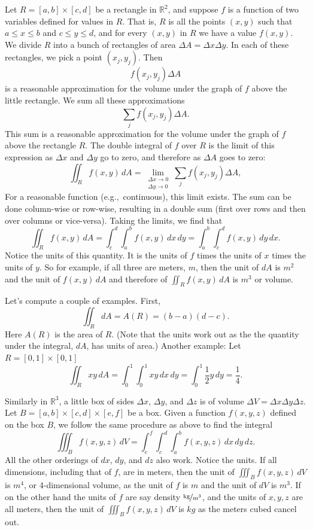 \documentclass[12pt]{article}
\newcommand{\R}{{\mathbb{R}}}
\begin{document}
Let $R = [a,b] \times [c,d]$ be a rectangle in $\R^2$, and suppose
$f$ is a function of two variables defined for values in $R$.
That is, $R$ is all the points
$(x,y)$ such that $a \leq x \leq b$ and $c \leq y \leq d$,
and for every $(x,y)$ in $R$ we have a value $f(x,y)$.
We divide $R$ into a bunch of rectangles of area $\Delta A = \Delta x \Delta y$.
In each of these rectangles, we pick a point $(x_j,y_j)$.  Then
\[
f(x_j,y_j) \Delta A
\]
is a reasonable approximation for the volume under the graph of $f$ above the little
rectangle.
We sum all these approximations
\[
\sum_j 
f(x_j,y_j) \Delta A .
\]
This sum is
a reasonable approximation for the volume under the graph of $f$ above the rectangle
$R$.
The double integral of $f$ over $R$ is the limit of
this expression
as $\Delta x$ and $\Delta y$ go to zero,
and therefore as $\Delta A$ goes to zero:
\[
\iint_R f(x,y) \, dA =
\lim_{\substack{\Delta x \to 0 \\ \Delta y \to 0}}
\sum_j 
f(x_j,y_j) \Delta A ,
\]
For a reasonable function (e.g.,\ continuous), this limit exists.
The sum can be done column-wise or row-wise, resulting in a
double sum (first over rows and then over columns or vice-versa).
Taking the limits, we find that
\[
\iint_R f(x,y) \, dA
=
\int_c^d \int_a^b f(x,y) \, dx \, dy
=
\int_a^b \int_c^d f(x,y) \, dy \, dx .
\]
Notice the units of this quantity.  It is the units of $f$ times the units of $x$ times
the units of $y$.  So for example, if all three are meters, $\unit{m}$,
then the unit of $dA$ is $\unit{m^2}$ and
the unit of
$f(x,y) \, dA$
and therefore of
$\iint_R f(x,y) \, dA$
is $\unit{m^3}$ or volume.

Let's compute a couple of examples.
First,
\[
\iint_R dA = A(R) = (b-a)(d-c) .
\]
Here $A(R)$ is the area of $R$.
(Note that the units work out as the 
the quantity under the integral, $dA$, has units of area.)
Another example:  Let $R = [0,1] \times [0,1]$
\[
\iint_R xy\, dA =
\int_0^1 \int_0^1 xy \, dx \, dy
=
\int_0^1 \frac{1}{2} y \, dy
= \frac{1}{4}.
\]

Similarly in $\R^3$, a little box of sides $\Delta x$, $\Delta y$, and $\Delta z$
is of volume $\Delta V = \Delta x \Delta y \Delta z$.  
Let $B = [a,b] \times [c,d] \times [e,f]$ be a box.
Given a function $f(x,y,z)$
defined on the box $B$, we follow
the same procedure as above to find the integral
\[
\iiint_B f(x,y,z) \, dV
=
\int_e^f \int_c^d \int_a^b f(x,y,z) \, dx \, dy \, dz .
\]
All the other orderings of $dx$, $dy$, and $dz$ also work.
Notice the units.  If all dimensions, including that of $f$, are in meters, then
the unit of
$\iiint_B f(x,y,z) \, dV$ is $\unit{m^4}$, or 4-dimensional volume,
as the unit of $f$ is $\unit{m}$ and the unit of $dV$ is $\unit{m^3}$.
If on the other hand the units of $f$ are say density $\unitfrac{kg}{m^3}$,
and the units of $x,y,z$ are all meters,
then the unit of
$\iiint_B f(x,y,z) \, dV$ is $\unit{kg}$ as the meters cubed cancel out.
\end{document}
